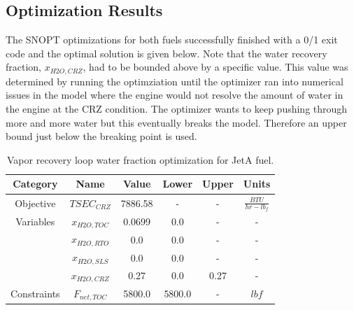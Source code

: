 \documentclass[12pt]{new-aiaa}
\begin{document}
\subsection{Optimization Results}
The SNOPT optimizations for both fuels successfully finished with a 0/1 exit code and the optimal solution is given below. Note that the water recovery fraction, $x_{H2O,CRZ}$, had to be bounded above by a specific value. This value was determined by running the optimziation until the optimizer ran into numerical issues in the model where the engine would not resolve the amount of water in the engine at the CRZ condition. The optimizer wants to keep pushing through more and more water but this eventually breaks the model. Therefore an upper bound just below the breaking point is used.

\begin{table}[H]
    \centering
    \caption{Vapor recovery loop water fraction optimization for JetA fuel.}
    \begin{tabular}{|c|c|c|c|c|c|}
        \hline
        Category    & Name          & Value   & Lower  & Upper & Units                 \\
        \hline
        Objective   & $TSEC_{CRZ}$  & 7886.58 & -      & -     & $\frac{BTU}{hr-lb_f}$ \\
        \hline
        Variables   & $x_{H2O,TOC}$ & 0.0699  & 0.0    & -     & -                     \\
                    & $x_{H2O,RTO}$ & 0.0     & 0.0    & -     & -                     \\
                    & $x_{H2O,SLS}$ & 0.0     & 0.0    & -     & -                     \\
                    & $x_{H2O,CRZ}$ & 0.27    & 0.0    & 0.27  & -                     \\
        \hline
        Constraints & $F_{net,TOC}$ & 5800.0  & 5800.0 & -     & $lbf$                 \\
        \hline
    \end{tabular}
    \label{tab_jeta_opt}
\end{table}
\end{document}
